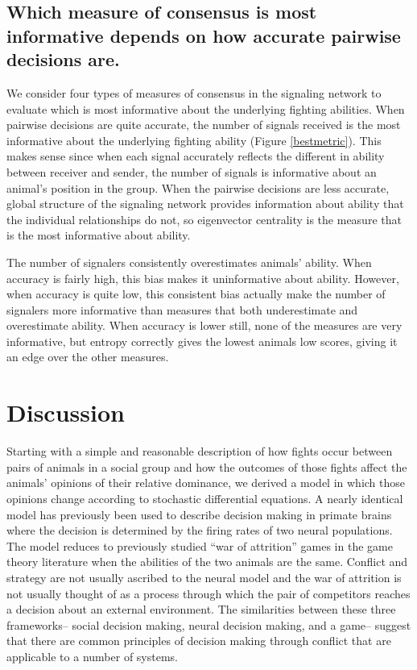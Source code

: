 \documentclass{article}
\begin{document}
\subsection{Which measure of consensus is most informative depends on how accurate pairwise decisions are. }
We consider four types of measures of consensus in the signaling network to evaluate which is most informative about the underlying fighting abilities.  When pairwise decisions are quite accurate, the number of signals received is the most informative about the underlying fighting ability (Figure \ref{bestmetric}).  This makes sense since when each signal accurately reflects the different in ability between receiver and sender, the number of signals is informative about an animal's position in the group.  When the pairwise decisions are less accurate, global structure of the signaling network provides information about ability that the individual relationships do not, so eigenvector centrality is the measure that is the most informative about ability.  

The number of signalers consistently overestimates animals' ability.  When accuracy is fairly high, this bias makes it uninformative about ability.  However, when accuracy is quite low, this consistent bias actually make the number of signalers more informative than measures that both underestimate and overestimate ability. When accuracy is lower still, none of the measures are very informative, but entropy correctly gives the lowest animals low scores, giving it an edge over the other measures.

\section{Discussion}

Starting with a simple and reasonable description of how fights occur between pairs of animals in a social group and how the outcomes of those fights affect the animals' opinions of their relative dominance, we derived  a model in which those opinions change according to stochastic differential equations.  A nearly identical model has previously been used to describe decision making in primate brains where the decision is determined by the firing rates of two neural populations.  The model reduces to previously studied ``war of attrition'' games in the game theory literature when the abilities of the two animals are the same.  Conflict and strategy are not usually ascribed to the neural model and the war of attrition is not usually thought of as a process through which the pair of competitors reaches a decision about an external environment.  The similarities between these three frameworks-- social decision making, neural decision making, and a game-- suggest that there are common principles of decision making through conflict that are applicable to a number of systems.
\end{document}
